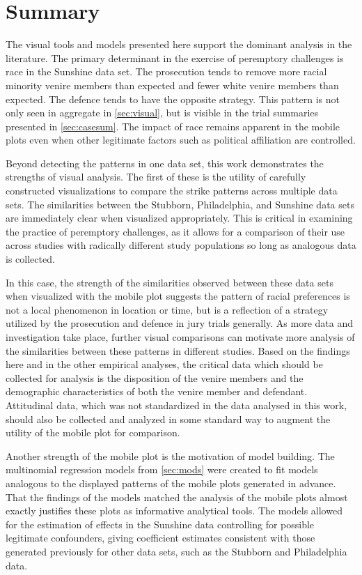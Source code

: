 \section{Summary}
\label{c:summary}

The visual tools and models presented here support the dominant analysis in the literature. The primary determinant in the
exercise of peremptory challenges is race in the Sunshine data set. The prosecution tends to remove more racial minority venire
members than expected and fewer white venire members than expected. The defence tends to have the
opposite strategy. This pattern is not only seen in aggregate in \ref{sec:visual}, but is visible in the trial summaries
presented in \ref{sec:casesum}. The impact of race remains apparent in the mobile plots even when other legitimate factors
such as political affiliation are controlled.

Beyond detecting the patterns in one data set, this work demonstrates the strengths of visual
analysis. The first of these is the utility of carefully constructed visualizations to compare the strike patterns across multiple data sets. The
similarities between the Stubborn, Philadelphia, and Sunshine data sets are immediately clear when visualized appropriately. This
is critical in examining the practice of peremptory challenges, as it allows for a comparison of their use across studies with
radically different study populations so long as analogous data is collected.

In this case, the strength of the similarities observed between these data sets when visualized with the mobile plot suggests the
pattern of racial preferences is not a local phenomenon in location or time, but is a reflection of a strategy utilized by the
prosecution and defence in jury trials generally. As more data and investigation take place, further visual comparisons can
motivate more analysis of the similarities between these patterns in different studies. Based on the findings here and in the
other empirical analyses, the critical data which should be collected for analysis is the disposition of the venire members and
the demographic characteristics of both the venire member and
defendant. Attitudinal data, which was not standardized in the data
analysed in this work, should also be collected and analyzed in some standard way to augment the utility of the mobile plot for comparison.

Another strength of the mobile plot is the motivation of model building. The multinomial regression models from \ref{sec:mods}
were created to fit models analogous to the displayed patterns of the mobile plots generated in advance. That the findings of the
models matched the analysis of the mobile plots almost exactly justifies these plots as informative analytical tools. The models
allowed for the estimation of effects in the Sunshine data controlling for possible legitimate confounders, giving
coefficient estimates consistent with those generated previously for other data sets, such as the Stubborn and Philadelphia data.

